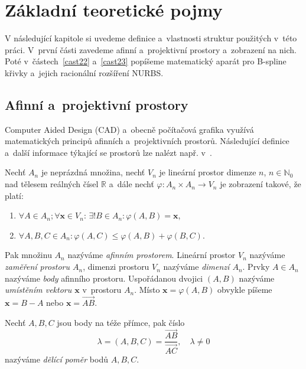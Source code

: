 \chapter{Základní teoretické pojmy}

V následující kapitole si uvedeme definice a~vlastnosti struktur použitých v~této práci. V~první části zavedeme afinní a~projektivní prostory a~zobrazení na nich. Poté v~částech~\ref{cast22} a~\ref{cast23} popíšeme matematický aparát pro B-spline křivky a~jejich racionální rozšíření NURBS.

\section{Afinní a~projektivní prostory}\label{cast21}
Computer Aided Design (CAD) a~obecně počítačová grafika využívá matematických principů afinních a~projektivních prostorů. Následující definice a~další informace týkající se prostorů lze nalézt např. v~\cite{Cadek2003,Horak2009,Janyska2018,Martisek2002,Martisekc2005}.

\begin{definice}
	Nechť $A_n$ je neprázdná množina, nechť $V_n$ je lineární prostor dimenze $n$, $n\in\mathbb{N}_0$ nad tělesem reálných čísel $\mathbb{R}$ a~dále nechť $\varphi: A_n\times A_n\to V_n$ je zobrazení takové, že platí:
	\begin{enumerate}[label=\alph*)]
		\item $\forall A\in A_n; \forall\mathbf{x}\in V_n$: $\exists!B\in A_n: \varphi\left(A,B\right)=\mathbf{x}$,
		\item $\forall A,B,C\in A_n: \varphi\left(A,C\right)\leq\varphi\left(A,B\right)+\varphi\left(B,C\right)$.
	\end{enumerate}
	Pak množinu $A_n$ nazýváme \emph{afinním prostorem}. Lineární prostor $V_n$ nazýváme \emph{zaměření prostoru $A_n$}, dimenzi prostoru $V_n$ nazýváme \emph{dimenzí $A_n$}. Prvky $A\in A_n$ nazýváme \emph{body} afinního prostoru. Uspořádanou dvojici $\left(A,B\right)$ nazýváme \emph{umístěním vektoru $\mathbf{x}$} v~prostoru $A_n$. Místo $\mathbf{x}=\varphi\left(A,B\right)$ obvykle píšeme $\mathbf{x}=B-A$ nebo $\mathbf{x}=\overrightarrow{AB}$.
\end{definice}

\begin{definice}
	Nechť $A,B,C$ jsou body na téže přímce, pak číslo
	\begin{equation}
		\lambda=\left(A,B,C\right)=\frac{\overrightarrow{AB}}{\overrightarrow{AC}},\quad\lambda\neq0
	\end{equation}
	nazýváme \emph{dělící poměr} bodů $A,B,C$.
\end{definice}

